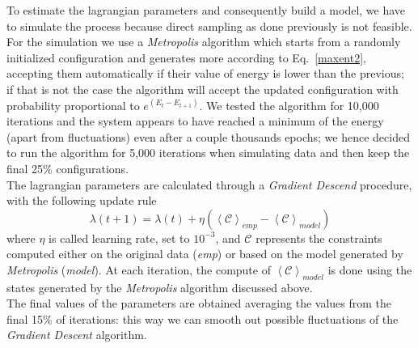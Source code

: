 \documentclass[a4paper,11pt]{article}
\begin{document}
To estimate the lagrangian parameters and consequently build a model, we have to simulate the process because direct sampling as done previously is not feasible. For the simulation we use a \emph{Metropolis} algorithm which starts from a randomly initialized configuration and generates more according to Eq.~\ref{maxent2}, accepting them automatically if their value of energy is lower than the previous; if that is not the case the algorithm will accept the updated configuration with probability proportional to $e^{(E_{t}-E_{t+1})}$. 
We tested the algorithm for 10,000 iterations and the system appears to have reached a minimum of the energy (apart from fluctuations) even after a couple thousands epochs; we hence decided to run the algorithm for 5,000 iterations when simulating data and then keep the final 25\% configurations.
\\
The lagrangian parameters are calculated through a \emph{Gradient Descend} procedure, with the following update rule
\begin{equation}
    \lambda (t+1) = \lambda(t) + \eta (\left \langle \mathcal{C} \right \rangle_{emp} - \left \langle \mathcal{C} \right \rangle_{model})
\end{equation}
where $\eta$ is called learning rate, set to $10^{-3}$, and $\mathcal{C}$ represents the constraints computed either on the original data (\emph{emp}) or based on the model generated by \emph{Metropolis} (\emph{model}). At each iteration, the compute of $\left \langle \mathcal{C} \right \rangle_{model}$ is done using the states generated by the \emph{Metropolis} algorithm discussed above. 
\\
The final values of the parameters are obtained averaging the values from the final 15\% of iterations: this way we can smooth out possible fluctuations of the \emph{Gradient Descent} algorithm.
\end{document}
